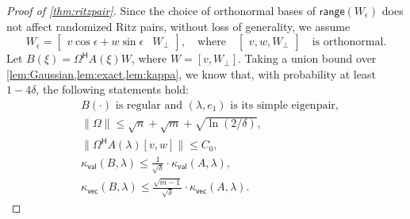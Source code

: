 \documentclass[a4paper,11pt]{article}
\newcommand{\Htran}{\mathsf{H}}
\newcommand{\range}{\mathsf{range}}
\newcommand{\kval}{\kappa_{\mathsf{val}}}
\newcommand{\kvec}{\kappa_{\mathsf{vec}}}
\providecommand{\norm}[1]{\lVert#1\rVert}
\providecommand{\bignorm}[1]{\bigl\lVert#1\bigr\rVert}
\begin{document}
\begin{proof}[Proof of \cref{thm:ritzpair}]
    Since the choice of orthonormal bases of $\range(W_{\epsilon})$ does not affect randomized Ritz pairs, without loss of generality, we assume
    \begin{equation*}
        W_{\epsilon} = 
        \begin{bmatrix}
            v\cos\epsilon+w\sin\epsilon & W_{\perp}
        \end{bmatrix},
        \quad\text{where}\quad 
        \begin{bmatrix}
            v,w,W_{\perp}
        \end{bmatrix}
        \quad\text{is orthonormal.}
    \end{equation*}
    Let $B(\xi)=\Omega^{\Htran}A(\xi)W$, where $W=[v,W_{\perp}]$.
    Taking a union bound over \cref{lem:Gaussian,lem:exact,lem:kappa}, we know that, with probability at least $1-4\delta$, the following statements hold:
    \begin{equation}
        \label{eq:Fval}
        \begin{aligned}
            &\text{$B(\cdot)$ is regular and $(\lambda,e_{1})$ is its simple eigenpair},\\ 
            &\norm{\Omega}\leq \sqrt{n}+\sqrt{m}+\sqrt{\ln(2/\delta)},\\ 
            &\bignorm{\Omega^{\Htran}A(\lambda)[v,w]}\leq C_{0},\\
            & \kval(B,\lambda) \leq  \frac{1}{\sqrt{\delta}}\cdot \kval(A,\lambda),\\ 
            & \kvec(B,\lambda) \leq \frac{\sqrt{m-1}}{\sqrt{\delta}}\cdot \kvec(A,\lambda).
        \end{aligned}
    \end{equation}
    

\end{proof}
\end{document}
